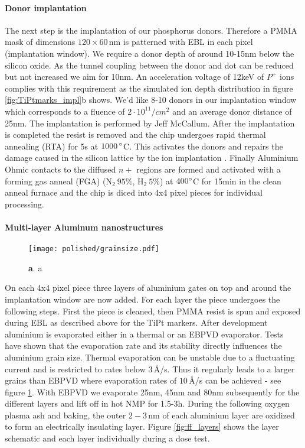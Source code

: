 \paragraph*{Donor implantation}
The next step is the implantation of our phosphorus donors. Therefore a PMMA mask of dimensions  $120\times60\,$nm is patterned with EBL in each pixel (implantation window). We require a donor depth of around 10-15nm below the silicon oxide. As the tunnel coupling between the donor and dot can be reduced but not increased we aim for 10nm. An acceleration voltage of 12keV of $P^+$ ions complies with this requirement as the simulated ion depth distribution in figure \ref{fig:TiPtmarks_impl}b shows. We'd like 8-10 donors in our implantation window which corresponds to a fluence of $2\cdot 10^{11}/cm^2$ and an average donor distance of 25nm. The implantation is performed by Jeff McCallum. After the implantation is completed the resist is removed and the chip undergoes rapid thermal annealing (RTA) for 5s at $1000\,\degree$C. This activates the donors and repairs the damage caused in the silicon lattice by the ion implantation \cite{McCamey2005}. Finally Aluminium Ohmic contacts to the diffused $n+$ regions are formed and activated with a forming gas anneal (FGA) (N$_2\ 95\%$, H$_2\ 5\%$) at $400\degree$C for 15min in the clean anneal furnace and the chip is diced into 4x4 pixel pieces for individual processing. 

\paragraph*{Multi-layer Aluminum nanostructures}

\begin{figure}
	\centering
	\texttt{[image: polished/grainsize.pdf]}
	\caption[grain size]{\textbf{a}. a }
	\label{fig:grainsize}
\end{figure}

On each 4x4 pixel piece three layers of aluminium gates on top and around the implantation window are now added. For each layer the piece undergoes the following steps. 
First the piece is cleaned, then PMMA resist is spun and exposed during EBL as described above for the TiPt markers. After development aluminium is evaporated either in a thermal or an EBPVD evaporator. Tests have shown that the evaporation rate and its stability directly influences the aluminium grain size. Thermal evaporation can be unstable due to a fluctuating current and is restricted to rates below $3\,$\AA/s. Thus it regularly leads to a larger grains than EBPVD where evaporation rates of $10\,$\AA/s can be achieved - see figure \ref{fig:grainsize}. With EBPVD we evaporate 25nm, 45nm and 80nm subsequently for the different layers and lift off in hot NMP for 1.5-3h. During the following oxygen plasma ash and baking, the outer $2-3\,$nm of each aluminium layer are oxidized to form an electrically insulating layer. Figure \ref{fig:ff_layers} shows the layer schematic and each layer individually during a dose test. 

